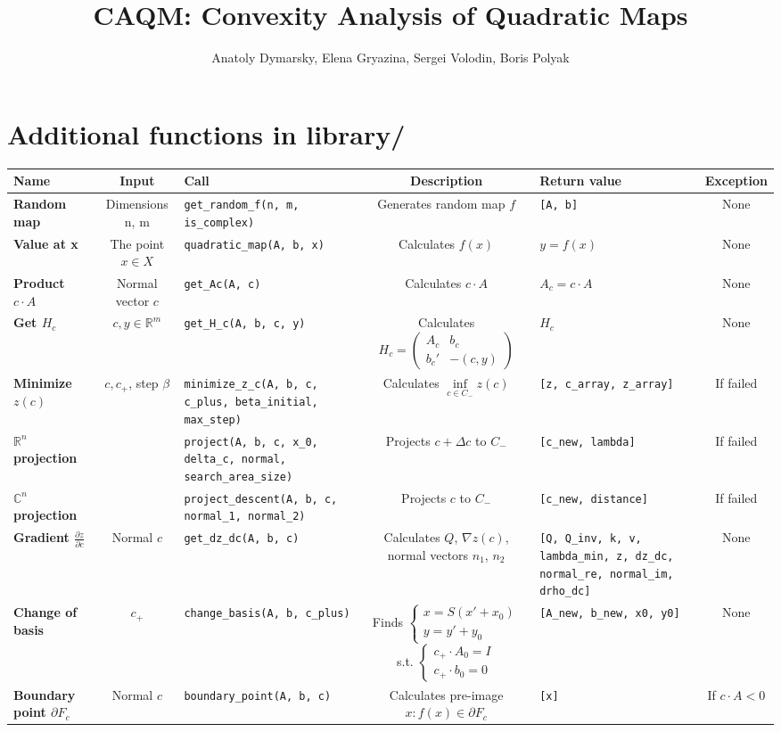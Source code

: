 \documentclass[a4paper]{article}
\title{CAQM: Convexity Analysis of Quadratic Maps}
\date{}
\author{Anatoly Dymarsky, Elena Gryazina, Sergei Volodin, Boris Polyak}
\newcommand{\R}{\mathbb{R}}
\begin{document}
\maketitle

\section{Additional functions in {\rm library/}}

\renewcommand{\arraystretch}{1.8}
\hspace{-3em}
\begin{tabular}{|p{35mm}|c|p{50mm}|c|p{30mm}|c|}
	\hline
	\bf Name & \bf Input & \bf Call & \bf Description & \bf Return value & \bf Exception\\\hline
	\bf Random map & {Dimensions n, m} & {\tt get\_random\_f(n, m, is\_complex)} & Generates random map $f$ & {\tt [A, b]} & None\\\hline
	\bf Value at x & The point $x\in X$ & {\tt quadratic\_map(A, b, x)} & Calculates $f(x)$ & $y=f(x)$ & None\\\hline
	\bf Product $c\cdot A$ & Normal vector $c$ & {\tt get\_Ac(A, c)} & Calculates $c\cdot A$ & $A_c=c\cdot A$ & None\\\hline
	\bf Get $H_c$ & $c,y\in\R^m$ & {\tt get\_H\_c(A, b, c, y)} & Calculates $H_c=\left(\begin{array}{cc}A_c & b_c\\b_c' &-(c,y) \end{array}\right)$ & $H_c$ & None\\\hline
	\bf Minimize $z(c)$ & $c,c_+$, step $\beta$ & {\tt minimize\_z\_c(A, b, c, c\_plus, beta\_initial, max\_step)} & Calculates $\inf\limits_{c\in C_-}z(c)$ & {\tt [z, c\_array, z\_array]} & If failed\\\hline
	\bf  $\R^n$ projection & & {\tt project(A, b, c, x\_0, delta\_c, normal, search\_area\_size)} & Projects $c+\Delta c$ to $C_-$ & {\tt [c\_new, lambda]} & If failed\\\hline
	\bf $\mathbb{C}^n$ projection & & {\tt project\_descent(A, b, c, normal\_1, normal\_2)} & Projects $c$ to $C_-$ & {\tt [c\_new, distance]} & If failed\\\hline
	\bf Gradient $\frac{\partial z}{\partial c}$ & Normal $c$ & {\tt get\_dz\_dc(A, b, c)} & Calculates $Q$, $\nabla z(c)$, normal vectors $n_1$, $n_2$ & {\tt [Q, Q\_inv, k, v, lambda\_min, z, dz\_dc, normal\_re, normal\_im, drho\_dc]} & None\\\hline
	\bf Change of basis & $c_+$ & {\tt change\_basis(A, b, c\_plus)} & Finds $\begin{cases}
	x = S(x'+x_0)\\
	y = y' + y_0
	\end{cases}
	$ s.t.
	$\begin{cases}
	c_+\cdot A_0=I\\
	c_+\cdot b_0=0
	\end{cases}$ & {\tt [A\_new, b\_new, x0, y0]} & None\\\hline
	\bf Boundary point $\partial F_c$ & Normal $c$ & {\tt boundary\_point(A, b, c)} & Calculates pre-image $x\colon f(x)\in\partial F_c$ & {\tt [x]} & If $c\cdot A<0$\\\hline
\end{tabular}
\end{document}
